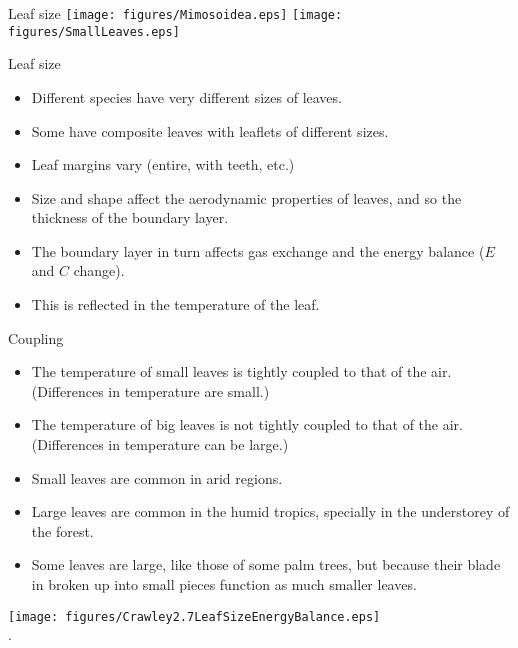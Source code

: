 \documentclass[10pt]{beamer}
\begin{document}
\begin{frame}{Leaf size}
    \centering\texttt{[image: figures/Mimosoidea.eps]}%
    \texttt{[image: figures/SmallLeaves.eps]}
\end{frame}

\begin{frame}{Leaf size}
    \begin{itemize}
        \item Different species have very different sizes of
        leaves.
        \item Some have composite leaves with leaflets of
        different sizes.
        \item Leaf margins vary (entire, with teeth, etc.)
        \item Size and shape affect the aerodynamic properties of
        leaves, and so the thickness of the boundary layer.
        \item The boundary layer in turn affects gas exchange and
        the energy balance ($E$ and $C$ change).
        \item This is reflected in the temperature of the leaf.
    \end{itemize}
\end{frame}

\begin{frame}{Coupling}
    \begin{itemize}
        \item The temperature of small leaves is tightly coupled
        to that of the air. (Differences in temperature are small.)
        \item The temperature of big leaves is not tightly
        coupled to that of the air. (Differences in temperature can be large.)
        \item Small leaves are common in arid regions.
        \item Large leaves are common in the humid tropics,
        specially in the understorey of the forest.
        \item Some leaves are large, like those of some palm
        trees, but because their blade in broken up into small
        pieces function as much smaller leaves.
    \end{itemize}
\end{frame}

\begin{frame}{}
    \centering\texttt{[image: figures/Crawley2.7LeafSizeEnergyBalance.eps]}\\
    {\small \autocite[from][]{Crawley1997}.}
\end{frame}
\end{document}
